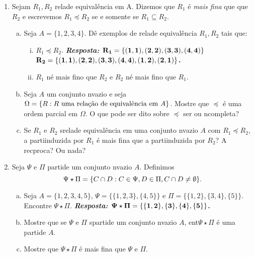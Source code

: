 \begin{enumerate}[{\bf 1.}]
\item Sejam $R_1,R_2$ rela\coes de equival\^encia em A. Dizemos que $R_1$ \'e {\it mais fina} que que $R_2$ e escrevemos $R_1\preceq R_2$ se e somente se $R_1\subseteq R_2$.
\begin{enumerate}[a)]
\item Seja $A=\{1,2,3,4\}$. D\^e exemplos de rela\coes de equival\^encia $R_1,R_2$ tais que:
\begin{enumerate}[i)]
\item $R_1\preceq R_2$. 
{\bf{\it Resposta:} ${\bf R_1=\{(1,1),(2,2),(3,3),(4,4)\}}$ ${\bf R_2=\{(1,1),(2,2),(3,3),(4,4),(1,2),(2,1)\}}$.}
\item $R_1$ n\ao \'e mais fino que $R_2$ e $R_2$ n\ao \'e mais fino que $R_1$. 
\end{enumerate}
\item Seja $A$ um conjunto n\ao vazio e seja $\Omega=\{R: R \textrm{ uma rela\cao de equival\^encia em $A$}\}$. Mostre que $\preceq$ \'e uma ordem parcial em $\Omega$. O que pode ser dito sobre $\preceq$ ser ou n\ao completa?
\item Se $R_1$ e $R_2$ s\ao rela\coes de equival\^encia em uma conjunto n\ao vazio $A$ com $R_1\preceq R_2$, a parti\cao induzida por $R_1$ \'e mais fina que a parti\cao induzida por $R_2$? A rec\ih proca? Ou nada?
\end{enumerate}

\item\label{eqexcer7} Seja $\Psi$ e $\Pi$ parti\coes de um conjunto n\ao vazio $A$. Definimos
\[
\Psi\star\Pi=\{C\cap D: C\in\Psi, D\in\Pi,C\cap D\neq\emptyset\}.
\]
\begin{enumerate}[a)]
\item Seja $A=\{1,2,3,4,5\}$, $\Psi=\{\{1,2,3\},\{4,5\}\}$ e $\Pi=\{\{1,2\},\{3,4\},\{5\}\}$. Encontre $\Psi\star\Pi$.
{\bf{\it Resposta:} ${\bf \Psi\star\Pi=\{\{1,2\},\{3\},\{4\},\{5\}\}}$.}
\item Mostre que se $\Psi$ e $\Pi$ s\ao parti\coes de um conjunto n\ao vazio $A$, ent\ao $\Psi\star\Pi$ \'e uma parti\cao de $A$.
\item Mostre que $\Psi\star\Pi$ \'e mais fina que $\Psi$ e $\Pi$.
\end{enumerate}


\end{enumerate}
